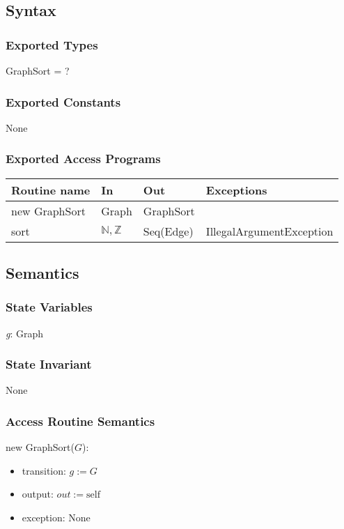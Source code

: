 \documentclass[12pt]{article}
\begin{document}
\subsection*{Syntax}

\subsubsection*{Exported Types}

GraphSort = ?

\subsubsection*{Exported Constants}

None

\subsubsection*{Exported Access Programs}

\begin{tabular}{| l | l | l | l |}
	\hline
	\textbf{Routine name} & \textbf{In} & \textbf{Out} & \textbf{Exceptions}\\
	\hline
	new GraphSort & Graph & GraphSort & ~\\
	\hline
	sort & $\mathbb{N}, \mathbb{Z}$ & Seq(Edge) & IllegalArgumentException\\
	\hline
\end{tabular}

\subsection*{Semantics}

\subsubsection*{State Variables}

\textit{g}: Graph

\subsubsection*{State Invariant}

None

\subsubsection*{Access Routine Semantics}

\noindent new GraphSort($G$):
\begin{itemize}
	\item transition: $\textit{g} := G$
	\item output: $out := \mbox{self}$
	\item exception: None
\end{itemize}
\end{document}
